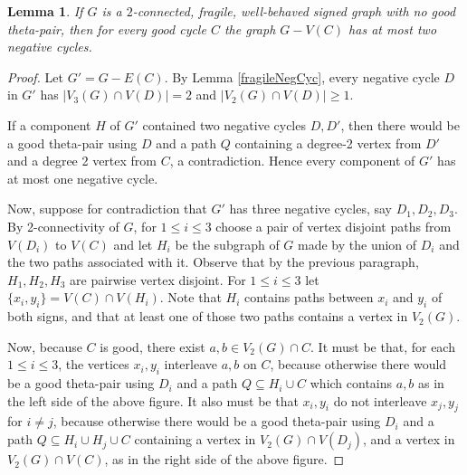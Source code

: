 \documentclass[10pt,a4paper]{amsart}
\newtheorem{lemma}{Lemma}
\begin{document}
\begin{lemma}\label{atMost2negCyc}
    If $G$ is a $2$-connected, fragile, well-behaved signed graph with no good theta-pair, then for every good cycle $C$ the graph $G - V(C)$ has at most two negative cycles.
\end{lemma}

\begin{proof}
     Let $G' = G - E(C)$. By Lemma \ref{fragileNegCyc}, every negative cycle $D$ in $G'$ has $|V_3(G) \cap V(D)| = 2$ and $|V_2(G) \cap V(D)| \ge 1$.

    \begin{figure}[H]
        \centering
        
        \label{fig:f1}
    \end{figure}
    
    

    If a component $H$ of $G'$ contained two negative cycles $D,D'$, then there would be a good theta-pair using $D$ and a path $Q$ containing a degree-2 vertex from $D'$ and a degree 2 vertex from $C$, a contradiction. Hence every component of $G'$ has at most one negative cycle. 


    Now, suppose for contradiction that $G'$ has three negative cycles, say $D_1, D_2, D_3$. By 2-connectivity of $G$, for $1 \le i \le 3$ choose a pair of vertex disjoint paths from $V(D_i)$ to $V(C)$ and let $H_i$ be the subgraph of $G$ made by the union of $D_i$ and the two paths associated with it. Observe that by the previous paragraph, $H_1, H_2, H_3$ are pairwise vertex disjoint. For $1 \le i \le 3$ let $\{x_i,y_i\} = V(C) \cap V(H_i)$. Note that $H_i$ contains paths between $x_i$ and $y_i$ of both signs, and that at least one of those two paths contains a vertex in $V_2(G)$.

    \begin{figure}[H]
        \centering
        
        \label{fig:f34}
    \end{figure}

    Now, because $C$ is good, there exist $a,b \in V_2(G) \cap C$. It must be that, for each $1 \le i \le 3$, the vertices $x_i, y_i$ interleave $a,b$ on $C$, because otherwise there would be a good theta-pair using $D_i$ and a path $Q \subseteq H_i \cup C$ which contains $a,b$ as in the left side of the above figure. It also must be that $x_i,y_i$ do not interleave $x_j,y_j$ for $i \neq j$, because otherwise there would be a good theta-pair using $D_i$ and a path $Q\subseteq H_i \cup H_j \cup C$ containing a vertex in $V_2(G) \cap V(D_j)$, and a vertex in $V_2(G) \cap V(C)$, as in the right side of the above figure.


\end{proof}
\end{document}
